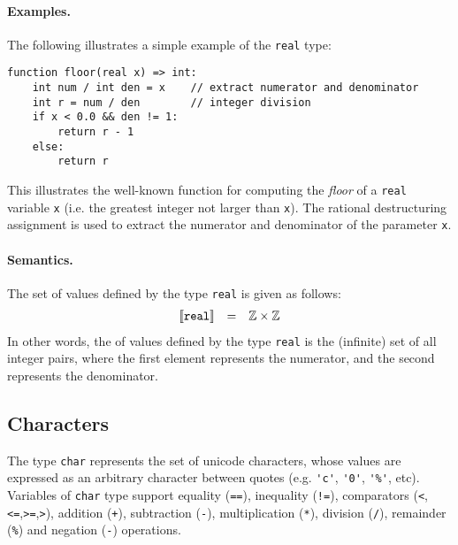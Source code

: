 \paragraph{Examples.}  The following illustrates a simple example of the \lstinline{real} type:

\begin{lstlisting}
function floor(real x) => int:
    int num / int den = x    // extract numerator and denominator
    int r = num / den        // integer division
    if x < 0.0 && den != 1: 	 
        return r - 1 
    else:
        return r 
\end{lstlisting}
This illustrates the well-known function for computing the {\em floor} of a \lstinline{real} variable \lstinline{x} (i.e. the greatest integer not larger than \lstinline{x}).  The rational destructuring assignment is used to extract the numerator and denominator of the parameter \lstinline{x}.

\paragraph{Semantics.}  The set of values defined by the type \lstinline{real} is given as follows:
\begin{displaymath}
\begin{array}{rcl}
\llbracket{\tt real}\rrbracket & = & \mathbb{Z}\times\mathbb{Z}\\
\end{array}
\end{displaymath}
In other words, the of values defined by the type \lstinline{real} is the (infinite) set of all integer pairs, where the first element represents the numerator, and the second represents the denominator.


\subsection{Characters}

The type \lstinline{char} represents the set of unicode characters, whose values are expressed as an arbitrary character between quotes (e.g. \lstinline{'c'}, \lstinline{'0'}, \lstinline{'%'}, etc).  Variables of \lstinline{char} type support equality (\lstinline{==}), inequality (\lstinline{!=}), comparators (\lstinline{<},\lstinline{<=},\lstinline{>=},\lstinline{>}), addition (\lstinline{+}), subtraction (\lstinline{-}), multiplication (\lstinline{*}), division (\lstinline{/}), remainder (\lstinline{%}) and negation (\lstinline{-}) operations.

